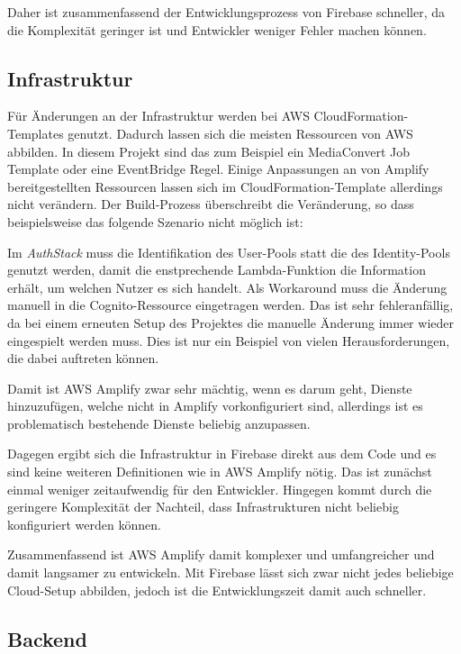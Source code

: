 Daher ist zusammenfassend der Entwicklungsprozess von Firebase schneller, da die Komplexität geringer ist und Entwickler weniger Fehler machen können.

\subsection{Infrastruktur}

Für Änderungen an der Infrastruktur werden bei \ac{AWS} CloudFormation-Templates genutzt. Dadurch lassen sich die meisten Ressourcen von \ac{AWS} abbilden. In diesem Projekt sind das zum Beispiel ein MediaConvert Job Template oder eine EventBridge Regel. Einige Anpassungen an von Amplify bereitgestellten Ressourcen lassen sich im CloudFormation-Template allerdings nicht verändern. Der Build-Prozess überschreibt die Veränderung, so dass beispielsweise das folgende Szenario nicht möglich ist:

Im \textit{AuthStack} muss die Identifikation des User-Pools statt die des Identity-Pools genutzt werden, damit die enstprechende Lambda-Funktion die Information erhält, um welchen Nutzer es sich handelt. Als Workaround muss die Änderung manuell in die Cognito-Ressource eingetragen werden. Das ist sehr fehleranfällig, da bei einem erneuten Setup des Projektes die manuelle Änderung immer wieder eingespielt werden muss. Dies ist nur ein Beispiel von vielen Herausforderungen, die dabei auftreten können.

Damit ist \ac{AWS} Amplify zwar sehr mächtig, wenn es darum geht, Dienste hinzuzufügen, welche nicht in Amplify vorkonfiguriert sind, allerdings ist es problematisch bestehende Dienste beliebig anzupassen.

Dagegen ergibt sich die Infrastruktur in Firebase direkt aus dem Code und es sind keine weiteren Definitionen wie in \ac{AWS} Amplify nötig. Das ist zunächst einmal weniger zeitaufwendig für den Entwickler. Hingegen kommt durch die geringere  Komplexität der Nachteil, dass Infrastrukturen nicht beliebig konfiguriert werden können.

Zusammenfassend ist \ac{AWS} Amplify damit komplexer und umfangreicher und damit langsamer zu entwickeln. Mit Firebase lässt sich zwar nicht jedes beliebige Cloud-Setup abbilden, jedoch ist die Entwicklungszeit damit auch schneller.

\subsection{Backend}

